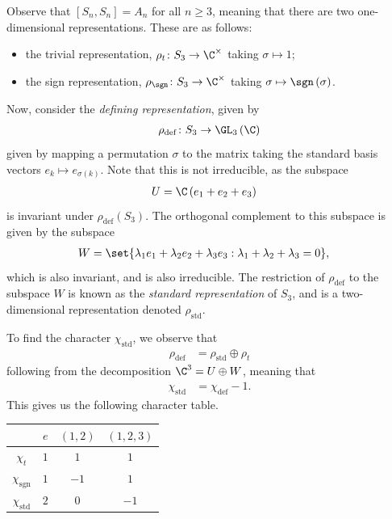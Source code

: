 \documentclass[10pt]{mypackage}
\begin{document}
Observe that $\left[ S_n,S_n \right] = A_n$ for all $n\geq 3$, meaning that there are two one-dimensional representations. These are as follows:
\begin{itemize}
  \item the trivial representation, $\rho_{t}\colon S_3\rightarrow \C^{\times}$ taking $\sigma\mapsto 1$;
  \item the sign representation, $\rho_{\sgn}\colon S_3\rightarrow \C^{\times}$ taking $\sigma\mapsto \sgn\left( \sigma \right)$.
\end{itemize}
Now, consider the \textit{defining representation}, given by
\begin{align*}
  \rho_{\operatorname{def}}\colon S_3\rightarrow \GL_3\left( \C \right)
\end{align*}
given by mapping a permutation $\sigma$ to the matrix taking the standard basis vectors $e_k\mapsto e_{\sigma(k)}$. Note that this is not irreducible, as the subspace
\begin{align*}
  U &= \C\left( e_1 + e_2 + e_3 \right)
\end{align*}
is invariant under $\rho_{\operatorname{def}}\left( S_3 \right)$. The orthogonal complement to this subspace is given by the subspace
\begin{align*}
  W &= \set{\lambda_1 e_1 + \lambda_2e_2 + \lambda_3e_3 : \lambda_1+\lambda_2+\lambda_3 = 0},
\end{align*}
which is also invariant, and is also irreducible. The restriction of $\rho_{\operatorname{def}}$ to the subspace $W$ is known as the \textit{standard representation} of $S_3$, and is a two-dimensional representation denoted $\rho_{\operatorname{std}}$.

To find the character $\chi_{\operatorname{std}}$, we observe that
\begin{align*}
  \rho_{\operatorname{def}} &= \rho_{\operatorname{std}}\oplus \rho_{t}
\end{align*}
following from the decomposition $\C^3 = U \oplus W$, meaning that
\begin{align*}
  \chi_{\operatorname{std}} &= \chi_{\operatorname{def}} - 1.
\end{align*}
This gives us the following character table.
\begin{center}
  \begin{tabular}{c|c|c|c}
    & $e$ & $\left( 1,2 \right)$ & $\left( 1,2,3 \right)$ \\
    \hline
    $\chi_{t}$ & $1$ & $1$ & $1$ \\
    $\chi_{\operatorname{sgn}}$ & $1$ & $-1$ & $1$\\
    $\chi_{\operatorname{std}}$ & $2$ & $0$ & $-1$
  \end{tabular}
\end{center}
\end{document}
